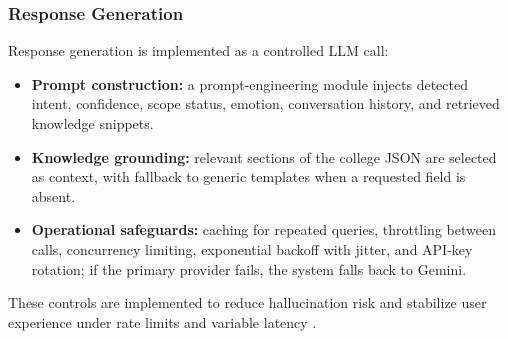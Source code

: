 \documentclass[12pt,onecolumn]{report}
\begin{document}
\subsubsection{Response Generation}
Response generation is implemented as a controlled LLM call:
\begin{itemize}
	\item \textbf{Prompt construction:} a prompt-engineering module injects detected intent, confidence, scope status, emotion, conversation history, and retrieved knowledge snippets.
	\item \textbf{Knowledge grounding:} relevant sections of the college JSON are selected as context, with fallback to generic templates when a requested field is absent.
	\item \textbf{Operational safeguards:} caching for repeated queries, throttling between calls, concurrency limiting, exponential backoff with jitter, and API-key rotation; if the primary provider fails, the system falls back to Gemini.
\end{itemize}
These controls are implemented to reduce hallucination risk and stabilize user experience under rate limits and variable latency \cite{khatri2018alexa,roller2021recipes}.
\end{document}
